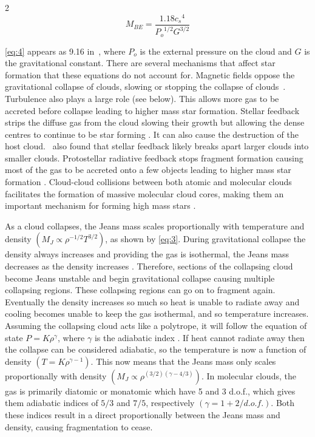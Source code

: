 \documentclass[a4paper,11pt]{article}
\begin{document}
\begin{multicols}{2}
\begin{equation}
    M_{BE} = \dfrac{1.18{c_s}^4}{{P_o}^{1/2}G^{3/2}}\label{eq:4}
    \tag{4}
\end{equation}

\par\noindent \autoref{eq:4} appears as 9.16 in\ \cite{SF}, where $P_o$ is the external pressure on the cloud and $G$ is the gravitational constant. There are several mechanisms that affect star formation that these equations do not account for. Magnetic fields oppose the gravitational collapse of clouds, slowing or stopping the collapse of clouds\ \parencite{B_fields}. Turbulence also plays a large role (see below). This allows more gas to be accreted before collapse leading to higher mass star formation. Stellar feedback strips the diffuse gas from the cloud slowing their growth but allowing the dense centres to continue to be star forming \parencite{Stellar_Feedback}. It can also cause the destruction of the host cloud.\ \cite{Stellar_Feedback} also found that stellar feedback likely breaks apart larger clouds into smaller clouds. Protostellar radiative feedback stops fragment formation causing most of the gas to be accreted onto a few objects leading to higher mass star formation \parencite{Protostellar_Feedback}. Cloud-cloud collisions between both atomic and molecular clouds facilitates the formation of massive molecular cloud cores, making them an important mechanism for forming high mass stars \parencite{Cloud_cloud_collisions}.
\smallskip
\par\noindent As a cloud collapses, the Jeans mass scales proportionally with temperature and density $\left(M_J \propto \rho^{-1/2}T^{3/2}\right)$, as shown by \autoref{eq:3}. During gravitational collapse the density always increases and providing the gas is isothermal, the Jeans mass decreases as the density increases \parencite{isothermal_frag}. Therefore, sections of the collapsing cloud become Jeans unstable and begin gravitational collapse causing multiple collapsing regions. These collapsing regions can go on to fragment again. Eventually the density increases so much so heat is unable to radiate away and cooling becomes unable to keep the gas isothermal, and so temperature increases. Assuming the collapsing cloud acts like a polytrope, it will follow the equation of state $P = K\rho^{\gamma}$, where $\gamma$ is the adiabatic index \parencite{adiabatic_frag}. If heat cannot radiate away then the collapse can be considered adiabatic, so the temperature is now a function of density $\left(T = K\rho^{\gamma - 1}\right)$. This now means that the Jeans mass only scales proportionally with density $\left(M_J \propto \rho^{\left(3/2\right)\left(\gamma-4/3\right)}\right)$. In molecular clouds, the gas is primarily diatomic or monatomic which have 5 and 3 d.o.f., which gives them adiabatic indices of $5/3$ and $7/5$, respectively $\left(\gamma=1+2/d.o.f.\right)$. Both these indices result in a direct proportionally between the Jeans mass and density, causing fragmentation to cease.

\end{multicols}
\end{document}
